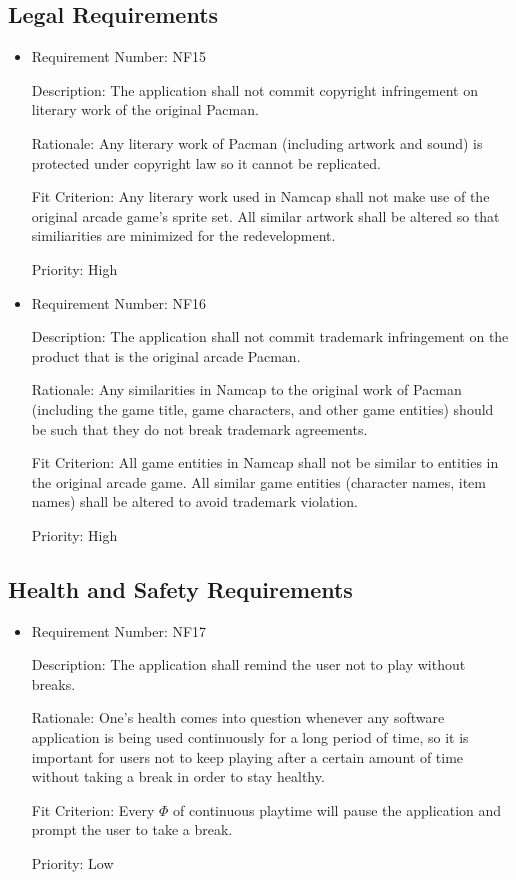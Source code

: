 \documentclass[12pt, titlepage]{article}
\begin{document}
\subsection{Legal Requirements}
\begin{itemize}
	\item
	Requirement Number: \hypertarget{nf15}{NF15}

	Description: The application shall not commit copyright infringement on literary work of the original Pacman.

	Rationale: Any literary work of Pacman (including artwork and sound) is protected under copyright law so it cannot be replicated.

	Fit Criterion: Any literary work used in Namcap shall not make use of the original arcade game's sprite set. All similar artwork shall be altered so that similiarities are minimized for the redevelopment.

	Priority: High

	\item
	Requirement Number: \hypertarget{nf16}{NF16}

	Description: The application shall not commit trademark infringement on the product that is the original arcade Pacman.

	Rationale: Any similarities in Namcap to the original work of Pacman (including the game title, game characters, and other game entities) should be such that they do not break trademark agreements.

	Fit Criterion: All game entities in Namcap shall not be similar to entities in the original arcade game. All similar game entities (character names, item names) shall be altered to avoid trademark violation.

	Priority: High
\end{itemize}

\subsection{Health and Safety Requirements}
\begin{itemize}
	\item
	Requirement Number: \hypertarget{nf17}{NF17}

	Description: The application shall remind the user not to play without breaks.

	Rationale: One's health comes into question whenever any software application is being used continuously for a long period of time, so it is important for users not to keep playing after a certain amount of time without taking a break in order to stay healthy.

	Fit Criterion: Every $\hyperref[tab:constants]{\Phi}$ of continuous playtime will pause the application and prompt the user to take a break.

	Priority: Low
\end{itemize}
\end{document}
